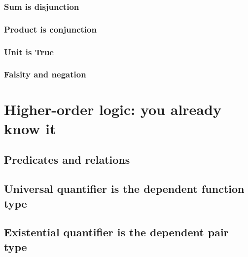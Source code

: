 \documentclass{beamer}
\begin{document}
\subsubsection{Sum is disjunction}
\subsubsection{Product is conjunction}
\subsubsection{Unit is True}

\subsubsection{Falsity and negation}





\section{Higher-order logic: you already know it}

\subsection{Predicates and relations}

\subsection{Universal quantifier is the dependent function type}
\subsection{Existential quantifier is the dependent pair type}
\end{document}
